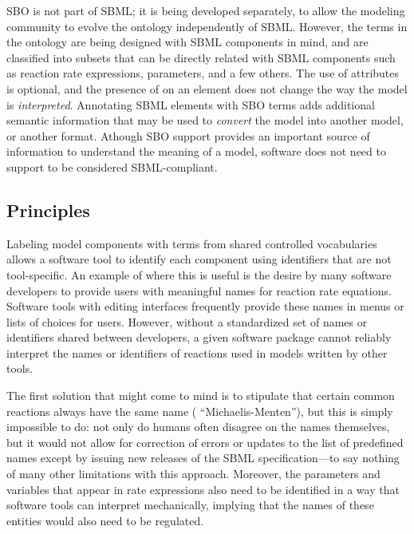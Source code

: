 SBO is not part of SBML; it is being developed separately, to
allow the modeling community to evolve the ontology independently
of SBML.  However, the terms in the ontology are being designed
with SBML components in mind, and are classified into subsets that
can be directly related with SBML components such as reaction rate
expressions, parameters, and a few others.  The use of
 attributes is optional, and the presence of
 on an element does not change the way the model is
\emph{interpreted}.  Annotating SBML elements with SBO terms
adds additional semantic information that may be used to
\emph{convert} the model into another model, or another format.
Athough SBO support provides an important source of information to
understand the meaning of a model, software does not need to
support  to be considered SBML-compliant.


\subsection{Principles}
\label{sec:sbo-principles}

Labeling model components with terms from shared controlled
vocabularies allows a software tool to identify each component using
identifiers that are not tool-specific.  An example of where this
is useful is the desire by many software developers to provide
users with meaningful names for reaction rate equations.  Software
tools with editing interfaces frequently provide these names
in menus or lists of choices for users.  However, without a
standardized set of names or identifiers shared between
developers, a given software package cannot reliably interpret the
names or identifiers of reactions used in models written
by other tools.

The first solution that might come to mind is to stipulate that
certain common reactions always have the same name (\eg
``Michaelis-Menten''), but this is simply impossible to do: not
only do humans often disagree on the names themselves, but it
would not allow for correction of errors or updates to the list of
predefined names except by issuing new releases of the SBML
specification---to say nothing of many other limitations with this
approach.  Moreover, the parameters and variables that appear in
rate expressions also need to be identified in a way that software
tools can interpret mechanically, implying that the names of these
entities would also need to be regulated.

